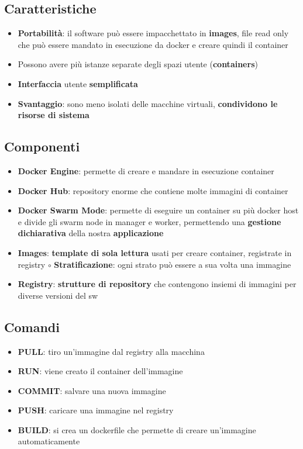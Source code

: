 \documentclass[a4paper, 12pt]{report}
\begin{document}
    \subsection{Caratteristiche}
    \begin{itemize}
      \item \textbf{Portabilità}: il software può essere impacchettato in \textbf{images}, file read only che può essere mandato in esecuzione da docker e creare quindi il container
      \item Possono avere più istanze separate degli spazi utente (\textbf{containers})
      \item \textbf{Interfaccia} utente \textbf{semplificata}
      \item \textbf{Svantaggio}: sono meno isolati delle macchine virtuali, \textbf{condividono le risorse di sistema}
    \end{itemize}
    \subsection{Componenti}
    \begin{itemize}
      \item \textbf{Docker Engine}: permette di creare e mandare in esecuzione container
      \item \textbf{Docker Hub}: repository enorme che contiene molte immagini di container
      \item \textbf{Docker Swarm Mode}: permette di eseguire un container su più docker host e divide gli swarm node in manager e worker, permettendo una \textbf{gestione dichiarativa} della nostra \textbf{applicazione}
      \item \textbf{Images}: \textbf{template di sola lettura} usati per creare container, registrate in registry
      \subitem $\circ$ \textbf{Stratificazione}: ogni strato può essere a sua volta una immagine 
      \item \textbf{Registry}: \textbf{strutture di repository} che contengono insiemi di immagini per diverse versioni del sw
    \end{itemize}
    \subsection{Comandi}
    \begin{itemize}
      \item \textbf{PULL}: tiro un'immagine dal registry alla macchina
      \item \textbf{RUN}: viene creato il container dell'immagine
      \item \textbf{COMMIT}: salvare una nuova immagine
      \item \textbf{PUSH}: caricare una immagine nel registry
      \item \textbf{BUILD}: si crea un dockerfile che permette di creare un'immagine automaticamente
    \end{itemize}
\end{document}

